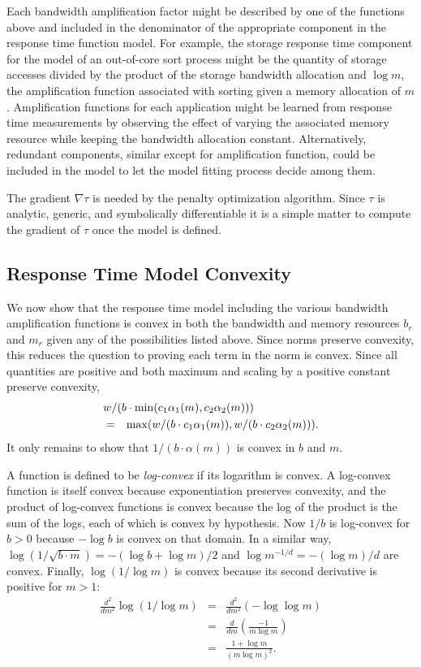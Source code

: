 Each bandwidth amplification factor might be described by one of the functions above
and included in the denominator of the appropriate component in the response time function model.
For example, the storage response time component for the model of an out-of-core sort process might be
the quantity of storage accesses divided by the product of the storage bandwidth allocation and $\log m$,
the amplification function associated with sorting given a memory allocation of $m$.
Amplification functions for each application might be learned from response time measurements
by observing the effect of varying the associated memory resource while keeping the bandwidth allocation constant.
Alternatively, redundant components, similar except for amplification function, could be included in the model
to let the model fitting process decide among them.

The gradient $\nabla\tau$ is needed by the penalty optimization algorithm.
Since $\tau$ is analytic, generic, and symbolically differentiable
it is a simple matter to compute the gradient of $\tau$ once the model is defined.

\subsection*{Response Time Model Convexity}

We now show that the response time model including the various bandwidth amplification functions is convex
in both the bandwidth and memory resources $b_r$ and $m_r$ given any of the possibilities listed above.
Since norms preserve convexity, this reduces the question to proving each term in the norm is convex.
Since all quantities are positive and both maximum and scaling by a positive constant preserve convexity,
\begin{eqnarray*}
\lefteqn{w/(b\cdot\min(c_1\alpha_1(m),c_2\alpha_2(m)))}   \\
&=& \max(w/(b\cdot c_1\alpha_1(m)),w/(b\cdot c_2\alpha_2(m))).
\end{eqnarray*}
It only remains to show that $1/(b\cdot\alpha(m))$ is convex in $b$ and $m$.

A function is defined to be \emph{log-convex} if its logarithm is convex.
A log-convex function is itself convex because exponentiation preserves convexity,
and the product of log-convex functions is convex because the log of the product is the sum of the logs,
each of which is convex by hypothesis.
Now $1/b$ is log-convex for $b > 0$ because $-\log b$ is convex on that domain.
In a similar way, $\log(1/\sqrt{b\cdot m}) = -(\log b + \log m)/2$
and $\log m^{-1/d} = -(\log m)/d$ are convex.
Finally, $\log (1/\log m)$ is convex because its second derivative is positive for $m > 1$:
\begin{eqnarray*}
\frac{d^2}{dm^2}\log (1/\log m) &=& \frac{d^2}{dm^2}(-\log\log m)  \\
                                  &=& \frac{d}{dm}\left(\frac{-1}{m\log m}\right) \\
                                  &=& \frac{1 + \log m}{(m\log m)^2}.
\end{eqnarray*}

